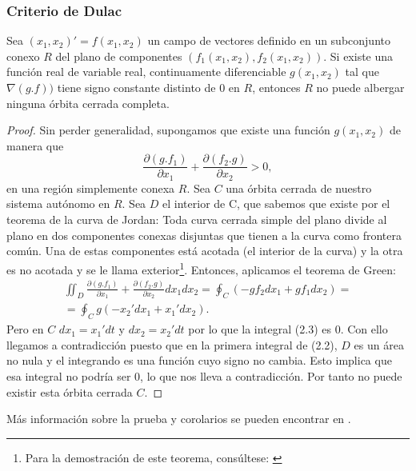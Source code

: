 \subsubsection{Criterio de Dulac}
\begin{theorem}
	Sea $(x_1,x_2)'=f(x_1,x_2)$ un campo de vectores definido en un subconjunto conexo $R$ del plano de componentes $(f_1(x_1,x_2), f_2(x_1,x_2))$. Si existe una función real de variable real, continuamente diferenciable $g(x_1,x_2)$ tal que $\nabla(g.f)) $ tiene signo constante distinto de $0$  en $R$, entonces $R$ no puede albergar ninguna órbita cerrada completa.
\end{theorem}
\begin{proof}
Sin perder generalidad, supongamos que existe una función $g(x_1,x_2)$ de manera que \[ \frac { \partial (g.f_1) }{ \partial x_1 } +\frac { \partial (f_2.g) }{ \partial x_2 } >0, \]
en una región simplemente conexa $R$. Sea $C$ una órbita cerrada de nuestro sistema autónomo en $R$. Sea $D$ el interior de C, que sabemos que existe por el teorema de la curva de Jordan: Toda curva cerrada simple del plano divide al plano en dos componentes conexas disjuntas que tienen a la curva como frontera común. Una de estas componentes está acotada (el interior de la curva) y la otra es no acotada y se le llama exterior\footnote{Para la demostración de este teorema, consúltese: \cite{jordan}}. Entonces, aplicamos el teorema de Green: 
\begin{align}
 \iint _{ D }^{  }{ \frac { \partial (g.f_1) }{ \partial x_1 } +\frac { \partial (f_2.g) }{ \partial x_2 } dx_1dx_2 } =\oint _{ C }^{  }{\left( -g f_2dx_1+g f_1 dx_2 \right)}= \\
= \oint _{ C }^{  }{ g \left( - x_2' dx_1+x_1' dx_2 \right)  }.
\end{align}
Pero en $C$ $dx_1=x_1'dt$ y $dx_2=x_2'dt$ por lo que la integral (2.3) es $0$. Con ello llegamos a contradicción puesto que en la primera integral de (2.2), $D$ es un área no nula y el integrando es una función cuyo signo no cambia. Esto implica que esa integral no podría ser 0, lo que nos lleva a contradicción. Por tanto no puede existir esta órbita cerrada $C$. 
\end{proof}
Más información sobre la prueba y corolarios se pueden encontrar en \cite{dulac}.

